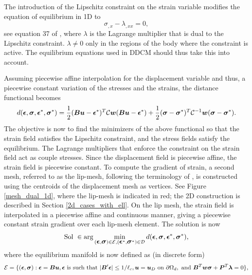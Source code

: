 \documentclass[10pt,review]{cas-sc}
\begin{document}
The introduction of the Lipschitz constraint on the strain variable modifies the equation of equilibrium in 1D to 
\begin{equation}
	\sigma_{,x}- \lambda_{,xx}=0,\label{equil_couple_1D}
\end{equation}
see equation 37 of \cite{Kamasamudram2023}, where $\lambda$ is the Lagrange multiplier that is dual to the Lipschitz constraint. $\lambda \neq 0$ only in the regions of the body where the constraint is active. The equilibrium equations used in DDCM should thus take this into account. 

Assuming piecewise affine interpolation for the displacement variable and thus, a piecewise constant variation of the stresses and the strains, the distance functional becomes
\begin{equation}
	d(\mbox{\boldmath $\epsilon$},\mbox{\boldmath $\sigma$},\mbox{\boldmath $\epsilon$}^*,\mbox{\boldmath $\sigma$}^*) = \frac{1}{2}(\mbox{\boldmath $B$} \mbox{\boldmath $u$} - \mbox{\boldmath $\epsilon$}^*)^T\mathcal{C}\mbox{\boldmath $w$}(\mbox{\boldmath $B$} \mbox{\boldmath $u$} - \mbox{\boldmath $\epsilon$}^*) + \frac{1}{2}(\mbox{\boldmath $\sigma$} - \mbox{\boldmath $\sigma$}^*)^T\mathcal{C}^{-1}\mbox{\boldmath $w$}(\mbox{\boldmath $\sigma$} - \mbox{\boldmath $\sigma$}^*).
\end{equation}
The objective is now to find the minimizers of the above functional so that the strain field satisfies the Lipschitz constraint, and the stress fields satisfy the equilibrium. The Lagrange multipliers that enforce the constraint on the strain field act as couple stresses. Since the displacement field is piecewise affine, the strain field is piecewise constant. To compute the gradient of strain, a second mesh, referred to as the lip-mesh, following the terminology of \cite{Chevaugeon2021}, is constructed using the centroids of the displacement mesh as vertices. See Figure \ref{mesh_dual_1d}, where the lip-mesh is indicated in red; the 2D construction is described in Section \ref{2d_cases_with_ell}. On the lip mesh, the strain field is interpolated in a piecewise affine and continuous manner, giving a piecewise constant strain gradient over each lip-mesh element. The solution is now
\begin{equation}
	\text{Sol } \in \arg \min_{(\mbox{\boldmath $\epsilon$},\mbox{\boldmath $\sigma$}) \in \mathcal{E}, (\mbox{\boldmath $\epsilon$}^*,\mbox{\boldmath $\sigma$}^*) \in \mathcal{D}} d(\mbox{\boldmath $\epsilon$},\mbox{\boldmath $\sigma$},\mbox{\boldmath $\epsilon$}^*,\mbox{\boldmath $\sigma$}^*),
\end{equation}
where the equilibrium manifold is now defined as (in discrete form)
\begin{equation}
	\mathcal{E} = \{(\mbox{\boldmath $\epsilon$},\mbox{\boldmath $\sigma$}) : \mbox{\boldmath $\epsilon$} = \mbox{\boldmath $B$} \mbox{\boldmath $u$}, \mbox{\boldmath $\epsilon$} \text{ is such that } |\mbox{\boldmath $B$}' \mbox{\boldmath $\epsilon$}|  \leq 1/{\ell_c} ,\mbox{\boldmath $u$} = \mbox{\boldmath $u$}_D \text{ on } \partial \Omega_d,
	\text{ and } \mbox{\boldmath $B$} ^T\mbox{\boldmath $w$} \mbox{\boldmath $\sigma$} + \mbox{\boldmath $P$}^T \mbox{\boldmath $\lambda$} = 0     \},
\end{equation}
\end{document}
